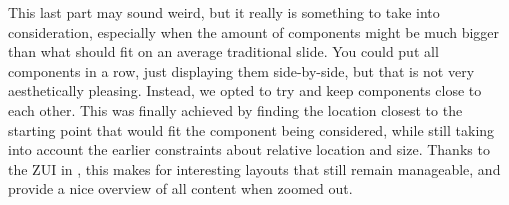     This last part may sound weird, but it really is something to take into
    consideration, especially when the amount of components might be much
    bigger than what should fit on an average traditional slide. You could put
    all components in a row, just displaying them side-by-side, but that is not
    very aesthetically pleasing. Instead, we opted to try and keep components
    close to each other. This was finally achieved by finding the location
    closest to the starting point that would fit the component being
    considered, while still taking into account the earlier constraints about
    relative location and size. Thanks to the ZUI in \mxp, this makes for
    interesting layouts that still remain manageable, and provide a nice
    overview of all content when zoomed out.
